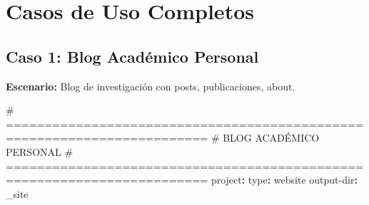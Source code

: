 \documentclass[
  doc,
  floatsintext,
  longtable,
  a4paper,
  nolmodern,
  notxfonts,
  notimes,
  12pt,
  colorlinks=true,linkcolor=blue,citecolor=blue,urlcolor=blue]{apa7}
\newenvironment{Shaded}{\begin{snugshade}}{\end{snugshade}}
\newcommand{\AttributeTok}[1]{\textcolor[rgb]{0.40,0.45,0.13}{#1}}
\newcommand{\CommentTok}[1]{\textcolor[rgb]{0.37,0.37,0.37}{#1}}
\newcommand{\FunctionTok}[1]{\textcolor[rgb]{0.28,0.35,0.67}{#1}}
\newcommand{\KeywordTok}[1]{\textcolor[rgb]{0.00,0.23,0.31}{\textbf{#1}}}
\begin{document}
\section{Casos de Uso Completos}\label{casos-de-uso-completos}

\subsection{Caso 1: Blog Académico
Personal}\label{caso-1-blog-acaduxe9mico-personal}

\textbf{Escenario:} Blog de investigación con posts, publicaciones,
about.

\begin{Shaded}
\begin{Highlighting}[]
\CommentTok{\# ========================================================================}
\CommentTok{\# BLOG ACADÉMICO PERSONAL}
\CommentTok{\# ========================================================================}
\FunctionTok{project}\KeywordTok{:}
\AttributeTok{  }\FunctionTok{type}\KeywordTok{:}\AttributeTok{ website}
\AttributeTok{  }\FunctionTok{output{-}dir}\KeywordTok{:}\AttributeTok{ \_site}


\end{Highlighting}
\end{Shaded}
\end{document}
